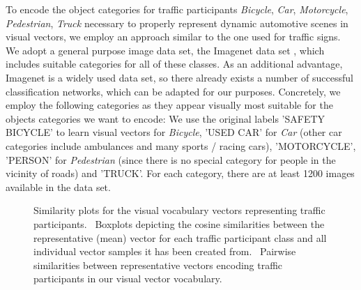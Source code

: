 To encode the object categories for traffic participants \emph{Bicycle}, \emph{Car}, \emph{Motorcycle}, \emph{Pedestrian}, \emph{Truck} necessary to properly represent dynamic automotive scenes in visual vectors, we employ an approach similar to the one used for traffic signs.
We adopt a general purpose image data set, the Imagenet data set \cite{Deng2009}, which includes suitable categories for all of these classes.
As an additional advantage, Imagenet is a widely used data set, so there already exists a number of successful classification networks, which can be adapted for our purposes.
Concretely, we employ the following categories as they appear visually most suitable for the objects categories we want to encode:
We use the original labels 'SAFETY BICYCLE' to learn visual vectors for \emph{Bicycle}, 'USED CAR' for \emph{Car} (other car categories include ambulances and many sports / racing cars), 'MOTORCYCLE', 'PERSON' for \emph{Pedestrian} (since there is no special category for people in the vicinity of roads) and 'TRUCK'.
For each category, there are at least \num{1200} images available in the data set.

\begin{figure}[t]
    \centering
    \caption{Similarity plots for the visual vocabulary vectors representing traffic participants.~\protect{} Boxplots depicting the cosine similarities between the representative (mean) vector for each traffic participant class and all individual vector samples it has been created from.~\protect{} Pairwise similarities between representative
    vectors encoding traffic participants in our visual vector vocabulary.}
    \label{fig:visual_vocab_traffic_participants}
\end{figure}

